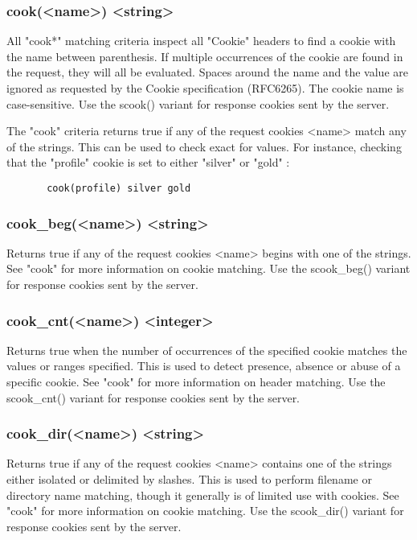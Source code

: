 \subsubsection[cook]{cook(<name>) <string>}
  All "cook*" matching criteria inspect all "Cookie" headers to find a cookie
  with the name between parenthesis. If multiple occurrences of the cookie are
  found in the request, they will all be evaluated. Spaces around the name and
  the value are ignored as requested by the Cookie specification (RFC6265). The
  cookie name is case-sensitive. Use the scook() variant for response cookies
  sent by the server.

  The "cook" criteria returns true if any of the request cookies <name> match
  any of the strings. This can be used to check exact for values. For instance,
  checking that the "profile" cookie is set to either "silver" or "gold" :
  \begin{verbatim}
       cook(profile) silver gold
  \end{verbatim}

\subsubsection[cook\_beg]{cook\_beg(<name>) <string>}
  Returns true if any of the request cookies <name> begins with one of the
  strings. See "cook" for more information on cookie matching. Use the
  scook\_beg() variant for response cookies sent by the server.

\subsubsection[cook\_cnt]{cook\_cnt(<name>) <integer>}
  Returns true when the number of occurrences of the specified cookie matches
  the values or ranges specified. This is used to detect presence, absence or
  abuse of a specific cookie. See "cook" for more information on header
  matching. Use the scook\_cnt() variant for response cookies sent by the
  server.

\subsubsection[cook\_dir]{cook\_dir(<name>) <string>}
  Returns true if any of the request cookies <name> contains one of the strings
  either isolated or delimited by slashes. This is used to perform filename or
  directory name matching, though it generally is of limited use with cookies.
  See "cook" for more information on cookie matching. Use the scook\_dir()
  variant for response cookies sent by the server.

